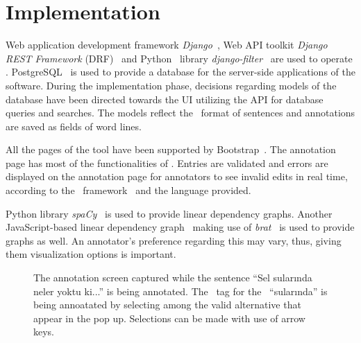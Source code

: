 \section{Implementation}
\label{sec:implementation}

Web application development framework \textit{Django}~\cite{django}, Web API toolkit \textit{Django REST Framework} (DRF)~\cite{drf} and Python~\cite{python} library \textit{django-filter}~\cite{django-filter} are used to operate \boatvtwo.
PostgreSQL~\cite{psql} is used to provide a database for the server-side applications of the software.
During the implementation phase, decisions regarding models of the database have been directed towards the UI utilizing the API for database queries and searches.
The models reflect the \ud\ format of sentences and annotations are saved as fields of word lines.

All the pages of the tool have been supported by Bootstrap~\cite{bootstrap}.
The annotation page has most of the functionalities of \boatvone.
Entries are validated and errors are displayed on the annotation page for annotators to see invalid edits in real time, according to the \ud\ framework~\cite{UD} and the language provided.

Python library \textit{spa\textsc{C}y}~\cite{spacy} is used to provide linear dependency graphs.
Another JavaScript-based linear dependency graph~\cite{spyssalo} making use of \textit{brat}~\cite{brat} is used to provide graphs as well.
An annotator's preference regarding this may vary, thus, giving them visualization options is important.

\begin{figure}[tbh]
    \centering
    \caption{The annotation screen captured while the sentence ``Sel sularında neler yoktu ki...'' is being annotated. The \deprel\ tag for the \form\ ``sularında'' is being annoatated by selecting among the valid alternative that appear in the pop up. Selections can be made with use of arrow keys.}
    \label{fig:anno-fig}
\end{figure}


